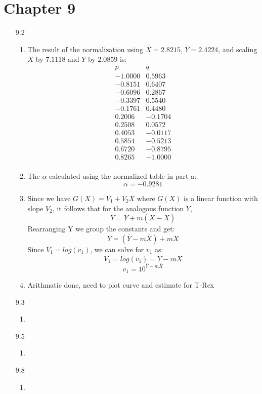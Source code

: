 \documentclass[11pt,a4paper]{article}
\begin{document}
	\section{Chapter 9}
		\begin{itemize}
			\item[9.2]
				\begin{enumerate} [label={\alph*)}]
					\item The result of the normalization using $\overline{X}=2.8215$, $\overline{Y}=2.4224$, and scaling $X$ by $7.1118$ and $Y$ by $2.0859$ is:
						$$\begin{array}{cc}
							p & q \\ \hline
							-1.0000  & 0.5963 \\
							-0.8151  & 0.6407 \\
							-0.6096  & 0.2867 \\
							-0.3397  & 0.5540 \\
							-0.1761  & 0.4480 \\
							0.2006 & -0.1704 \\
							0.2508  & 0.0572 \\
							0.4053   & -0.0117 \\
							0.5854  & -0.5213 \\
							0.6720  & -0.8795 \\
							0.8265  & -1.0000 \\
							
						
						\end{array}$$
					\item The $\alpha$ calculated using the normalized table in part a: $$\alpha = -0.9281$$
					\item Since we have $G(X)=V_1 + V_2 X$ where $G(X)$ is a linear function with slope $V_2$, it follows that for the analogous function $Y$,
					$$Y=\overline{Y} + m(X-\overline{X})$$
					Rearranging Y we group the constants and get:
					$$Y=(\overline{Y}-m\overline{X})+mX$$ Since $V_1=log(v_1)$, we can solve for $v_1$ as:
					$$V_1= log(v_1)=\overline{Y}-m\overline{X}$$
					$$v_1=10^{\overline{Y}-m\overline{X}}$$
					\item Arithmatic done, need to plot curve and estimate for T-Rex
				\end{enumerate}
					
			\item[9.3]
				\begin{enumerate} [label={\alph*)}]
					\item
				\end{enumerate}
				
			\item[9.5]
				\begin{enumerate} [label={\alph*)}]
					\item
				\end{enumerate}
				
			\item[9.8]
				\begin{enumerate} [label={\alph*)}]
					\item
				\end{enumerate}
		\end{itemize}
		
	
\end{document}
